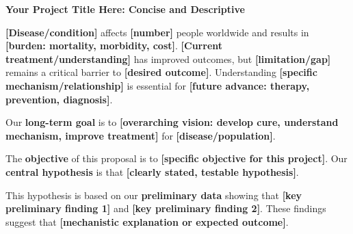 \documentclass[11pt,letterpaper]{article}
\begin{document}


\begin{center}
\textbf{\large Your Project Title Here: Concise and Descriptive}
\end{center}

\vspace{0.3cm}


\textbf{[Disease/condition]} affects \textbf{[number]} people worldwide and results in \textbf{[burden: mortality, morbidity, cost]}. \textbf{[Current treatment/understanding]} has improved outcomes, but \textbf{[limitation/gap]} remains a critical barrier to \textbf{[desired outcome]}. Understanding \textbf{[specific mechanism/relationship]} is essential for \textbf{[future advance: therapy, prevention, diagnosis]}.

\vspace{0.2cm}


Our \textbf{long-term goal} is to \textbf{[overarching vision: develop cure, understand mechanism, improve treatment]} for \textbf{[disease/population]}. 

\vspace{0.2cm}


The \textbf{objective} of this proposal is to \textbf{[specific objective for this project]}. Our \textbf{central hypothesis} is that \textbf{[clearly stated, testable hypothesis]}.

\vspace{0.2cm}


This hypothesis is based on our \textbf{preliminary data} showing that \textbf{[key preliminary finding 1]} and \textbf{[key preliminary finding 2]}. These findings suggest that \textbf{[mechanistic explanation or expected outcome]}.

\vspace{0.2cm}
\end{document}
